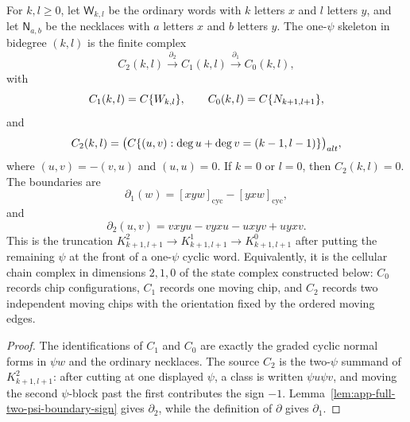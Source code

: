 \begin{constr}
\label{constr:app-one-psi-three-term-skeleton}
  For \(k,l\geq0\), let \(\mathsf W_{k,l}\) be the ordinary words with
  \(k\) letters \(x\) and \(l\) letters \(y\), and let
  \(\mathsf N_{a,b}\) be the necklaces with \(a\) letters \(x\) and
  \(b\) letters \(y\).  The one-\(\psi\) skeleton in bidegree \((k,l)\) is
  the finite complex
  \[
    C_2(k,l)\xrightarrow{\partial_2}C_1(k,l)
      \xrightarrow{\partial_1}C_0(k,l),
  \]
  with
  \[
    C_1(k,l)=C\{W_{k,l}\},\qquad
    C_0(k,l)=C\{N_{k+1,l+1}\},
  \]
  and
  \[
    C_2(k,l)=
    \bigl(C\{(u,v):\deg u+\deg v=(k-1,l-1)\}\bigr)_{alt},
  \]
  where \((u,v)=-(v,u)\) and \((u,u)=0\).  If \(k=0\) or \(l=0\), then
  \(C_2(k,l)=0\).  The boundaries are
  \[
    \partial_1(w)=[xyw]_{\mathrm{cyc}}-[yxw]_{\mathrm{cyc}},
  \]
  and
  \[
    \partial_2(u,v)=vxyu-vyxu-uxyv+uyxv.
  \]
  This is the truncation
  \(K^2_{k+1,l+1}\to K^1_{k+1,l+1}\to K^0_{k+1,l+1}\) after putting the
  remaining \(\psi\) at the front of a one-\(\psi\) cyclic word.
  Equivalently, it is the cellular chain complex in dimensions
  \(2,1,0\) of the state complex constructed below: \(C_0\) records chip
  configurations, \(C_1\) records one moving chip, and \(C_2\) records two
  independent moving chips with the orientation fixed by the ordered moving
  edges.
\end{constr}

\begin{proof}
  The identifications of \(C_1\) and \(C_0\) are exactly the graded cyclic
  normal forms in \(\psi w\) and the ordinary necklaces.  The source
  \(C_2\) is the two-\(\psi\) summand of \(K^2_{k+1,l+1}\): after cutting
  at one displayed \(\psi\), a class is written \(\psi u\psi v\), and
  moving the second \(\psi\)-block past the first contributes the sign
  \(-1\).  Lemma~\ref{lem:app-full-two-psi-boundary-sign} gives
  \(\partial_2\), while the definition of \(\partial\) gives
  \(\partial_1\).
\end{proof}

